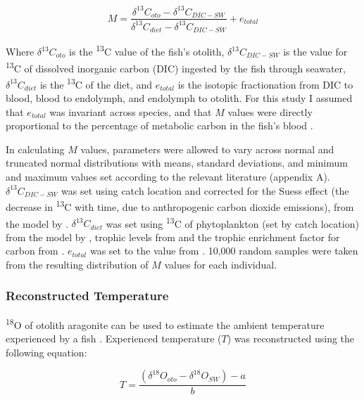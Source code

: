 \documentclass[12pt, titlepage]{article}
\begin{document}
\begin{equation}
M = \frac{\delta^{13}C_{oto}-\delta^{13}C_{DIC-SW}}{\delta^{13}C_{diet}-\delta^{13}C_{DIC-SW}} + e_{total}
\end{equation}

\noindent Where $\delta^{13}C_{oto}$ is the \textdelta \textsuperscript{13}C value of the fish's otolith, $\delta^{13}C_{DIC-SW}$ is the value for \textdelta \textsuperscript{13}C of dissolved inorganic carbon (DIC) ingested by the fish through seawater, $\delta^{13}C_{diet}$ is the \textdelta \textsuperscript{13}C of the diet, and $e_{total}$ is the isotopic fractionation from DIC to blood, blood to endolymph, and endolymph to otolith. 
For this study I assumed that $e_{total}$ was invariant across species, and that $M$ values were directly proportional to the percentage of metabolic carbon in the fish's blood \citep{Chung2019b}.

In calculating $M$ values, parameters were allowed to vary across normal and truncated normal \citep{truncnorm} distributions with means, standard deviations, and minimum and maximum values set according to the relevant literature (appendix A).
$\delta^{13}C_{DIC-SW}$ was set using catch location and corrected for the Suess effect (the decrease in \textdelta \textsuperscript{13}C with time, due to anthropogenic carbon dioxide emissions), from the model by \cite{Tagliabue2008}.
$\delta^{13}C_{diet}$ was set using \textdelta \textsuperscript{13}C of phytoplankton (set by catch location) from the model by \cite{Magozzi2017}, trophic levels from \cite{Fishbase}
and the trophic enrichment factor for carbon from \cite{DeNiro1978}.
$e_{total}$ was set to the value from \cite{Solomon2006}.
10,000 random samples were taken from the resulting distribution of $M$ values for each individual.

\subsubsection{Reconstructed Temperature}
\label{sec:temp}

\textdelta \textsuperscript{18}O of otolith aragonite can be used to estimate the ambient temperature experienced by a fish \citep{Thorrold1997, Hoie2004}.
Experienced temperature ($T$) was reconstructed using the following equation:

\begin{equation}
T = \frac{(\delta^{18}O_{oto} - \delta^{18}O_{SW}) - a}{b}
\end{equation}
\end{document}
